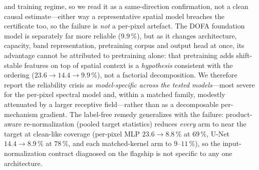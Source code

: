 \documentclass[preprint,3p,times]{elsarticle}
\begin{document}
and training regime, so we read it as a same-direction confirmation, not a clean causal estimate---either way a representative spatial model breaches the certificate too, so the failure is \emph{not} a per-pixel artefact. The DOFA foundation model is separately far more reliable ($9.9\,\%$), but as it changes architecture, capacity, band representation, pretraining corpus and output head at once, its advantage cannot be attributed to pretraining alone: that pretraining adds shift-stable features on top of spatial context is a \emph{hypothesis} consistent with the ordering ($23.6 \to 14.4 \to 9.9\,\%$), not a factorial decomposition. We therefore report the reliability crisis as \emph{model-specific across the tested models}---most severe for the per-pixel spectral model and, within a matched family, modestly attenuated by a larger receptive field---rather than as a decomposable per-mechanism gradient. The label-free remedy generalizes with the failure: product-aware re-normalization (pooled target statistics) reduces \emph{every} arm to near the target at clean-like coverage (per-pixel MLP $23.6 \to 8.8\,\%$ at $69\,\%$, U-Net $14.4 \to 8.9\,\%$ at $78\,\%$, and each matched-kernel arm to $9$--$11\,\%$), so the input-normalization contract diagnosed on the flagship is not specific to any one architecture.
\end{document}
